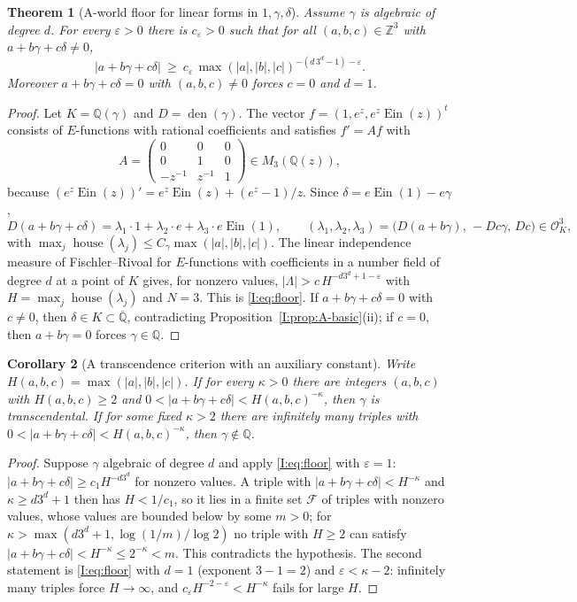 \documentclass[11pt,a4paper]{article}
\newcommand{\Q}{\mathbb Q}
\newcommand{\Z}{\mathbb Z}
\newcommand{\Qbar}{\overline{\mathbb Q}}
\newcommand{\Ein}{\operatorname{Ein}}
\DeclareMathOperator{\den}{den}
\DeclareMathOperator{\house}{house}
\newtheorem{theorem}{Theorem}[section]
\newtheorem{corollary}[theorem]{Corollary}
\theoremstyle{definition}
\theoremstyle{remark}
\numberwithin{equation}{section}
\begin{document}
\begin{theorem}[$\mathrm A$-world floor for linear forms in $1,\gamma,\delta$]\label{I:thm:floor}
Assume $\gamma$ is algebraic of degree $d$. For every $\varepsilon>0$ there is
$c_\varepsilon>0$ such that for all $(a,b,c)\in\Z^3$ with $a+b\gamma+c\delta\ne0$,
\begin{equation}\label{I:eq:floor}
 |a+b\gamma+c\delta|\ \ge\ c_\varepsilon\,\max(|a|,|b|,|c|)^{-(d\,3^d-1)-\varepsilon}.
\end{equation}
Moreover $a+b\gamma+c\delta=0$ with $(a,b,c)\ne0$ forces $c=0$ and $d=1$.
\end{theorem}
\begin{proof}
Let $K=\Q(\gamma)$ and $D=\den(\gamma)$. The vector $f=(1,e^z,e^z\Ein(z))^t$ consists of
$E$-functions with rational coefficients and satisfies $f'=Af$ with
\[
 A=\begin{pmatrix}0&0&0\\0&1&0\\-z^{-1}&z^{-1}&1\end{pmatrix}\in M_3(\Q(z)),
\]
because $(e^z\Ein(z))'=e^z\Ein(z)+(e^z-1)/z$. Since $\delta=e\Ein(1)-e\gamma$,
\[
 D(a+b\gamma+c\delta)=\lambda_1\cdot1+\lambda_2\cdot e+\lambda_3\cdot e\Ein(1),\qquad
 (\lambda_1,\lambda_2,\lambda_3)=\bigl(D(a+b\gamma),\,-Dc\gamma,\,Dc\bigr)\in\mathcal O_K^3,
\]
with $\max_j\house(\lambda_j)\le C_\gamma\max(|a|,|b|,|c|)$. The linear independence
measure of Fischler--Rivoal \cite[Thm.~1]{FRliouville} for $E$-functions with
coefficients in a number field of degree $d$ at a point of $K$ gives, for nonzero values,
$|\Lambda|>c\,H^{-d3^d+1-\varepsilon}$ with $H=\max_j\house(\lambda_j)$ and $N=3$. This is
\eqref{I:eq:floor}. If $a+b\gamma+c\delta=0$ with $c\ne0$, then $\delta\in K\subset\Qbar$,
contradicting Proposition~\ref{I:prop:A-basic}(ii); if $c=0$, then $a+b\gamma=0$ forces
$\gamma\in\Q$.
\end{proof}

\begin{corollary}[A transcendence criterion with an auxiliary constant]\label{I:cor:criterion}
Write $H(a,b,c)=\max(|a|,|b|,|c|)$. If for every $\kappa>0$ there are integers
$(a,b,c)$ with $H(a,b,c)\ge2$ and $0<|a+b\gamma+c\delta|<H(a,b,c)^{-\kappa}$, then
$\gamma$ is transcendental. If for some fixed $\kappa>2$ there are infinitely many
triples with $0<|a+b\gamma+c\delta|<H(a,b,c)^{-\kappa}$, then $\gamma\notin\Q$.
\end{corollary}
\begin{proof}
Suppose $\gamma$ algebraic of degree $d$ and apply \eqref{I:eq:floor} with
$\varepsilon=1$: $|a+b\gamma+c\delta|\ge c_1H^{-d3^d}$ for nonzero values. A triple with
$|a+b\gamma+c\delta|<H^{-\kappa}$ and $\kappa\ge d3^d+1$ then has $H<1/c_1$, so it lies in
a finite set $\mathcal F$ of triples with nonzero values, whose values are bounded below
by some $m>0$; for $\kappa>\max(d3^d+1,\log(1/m)/\log2)$ no triple with $H\ge2$ can satisfy
$|a+b\gamma+c\delta|<H^{-\kappa}\le2^{-\kappa}<m$. This contradicts the hypothesis. The
second statement is \eqref{I:eq:floor} with $d=1$ (exponent $3-1=2$) and
$\varepsilon<\kappa-2$: infinitely many triples force $H\to\infty$, and
$c_\varepsilon H^{-2-\varepsilon}<H^{-\kappa}$ fails for large $H$.
\end{proof}
\end{document}
